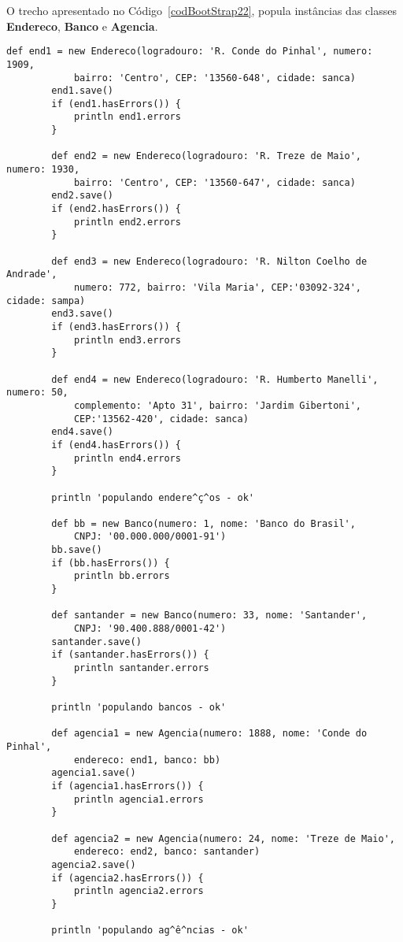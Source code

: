 \newpage

O  trecho  apresentado  no  Código~\ref{codBootStrap22}, popula  instâncias  das
classes {\bf Endereco}, {\bf Banco} e {\bf Agencia}.  

\begin{lstlisting}[caption={\bf BootStrap.groovy (2)}, frame = trBL, float=htbp,
    label=codBootStrap22]
        def end1 = new Endereco(logradouro: 'R. Conde do Pinhal', numero: 1909, 
            bairro: 'Centro', CEP: '13560-648', cidade: sanca)
        end1.save()
        if (end1.hasErrors()) {
            println end1.errors
        }
        
        def end2 = new Endereco(logradouro: 'R. Treze de Maio', numero: 1930, 
            bairro: 'Centro', CEP: '13560-647', cidade: sanca)
        end2.save()
        if (end2.hasErrors()) {
            println end2.errors
        }
        
        def end3 = new Endereco(logradouro: 'R. Nilton Coelho de Andrade',
            numero: 772, bairro: 'Vila Maria', CEP:'03092-324', cidade: sampa)
        end3.save()
        if (end3.hasErrors()) {
            println end3.errors
        }
        
        def end4 = new Endereco(logradouro: 'R. Humberto Manelli', numero: 50, 
            complemento: 'Apto 31', bairro: 'Jardim Gibertoni', 
            CEP:'13562-420', cidade: sanca)
        end4.save()
        if (end4.hasErrors()) {
            println end4.errors
        }
        
        println 'populando endere^ç^os - ok'
        
        def bb = new Banco(numero: 1, nome: 'Banco do Brasil', 
            CNPJ: '00.000.000/0001-91')
        bb.save()
        if (bb.hasErrors()) {
            println bb.errors
        }
        
        def santander = new Banco(numero: 33, nome: 'Santander', 
            CNPJ: '90.400.888/0001-42')
        santander.save()
        if (santander.hasErrors()) {
            println santander.errors
        }

        println 'populando bancos - ok'
        
        def agencia1 = new Agencia(numero: 1888, nome: 'Conde do Pinhal', 
            endereco: end1, banco: bb)    
        agencia1.save()
        if (agencia1.hasErrors()) {
            println agencia1.errors
        }
    
        def agencia2 = new Agencia(numero: 24, nome: 'Treze de Maio', 
            endereco: end2, banco: santander)
        agencia2.save()
        if (agencia2.hasErrors()) {
            println agencia2.errors
        }
        
        println 'populando ag^ê^ncias - ok'
\end{lstlisting}

